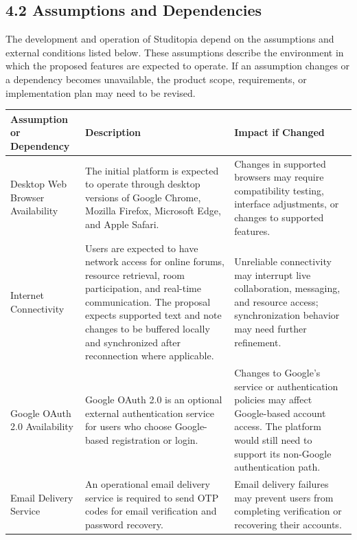 \documentclass[12pt]{article}
\renewcommand{\baselinestretch}{1.5}
\begin{document}
\subsection*{4.2 Assumptions and Dependencies}
\par\medskip
The development and operation of Studitopia depend on the assumptions and external conditions listed below. These assumptions describe the environment in which the proposed features are expected to operate. If an assumption changes or a dependency becomes unavailable, the product scope, requirements, or implementation plan may need to be revised.
\par\medskip
\begingroup
\scriptsize
\renewcommand{\baselinestretch}{1.0}\selectfont
\renewcommand{\arraystretch}{1.15}
\setlength{\tabcolsep}{4pt}
\begin{longtable}{|>{\raggedright\arraybackslash}p{}|>{\raggedright\arraybackslash}p{}|>{\raggedright\arraybackslash}p{}|}
\hline
Assumption or Dependency & Description & Impact if Changed \\ \hline
\endhead
Desktop Web Browser Availability & The initial platform is expected to operate through desktop versions of Google Chrome, Mozilla Firefox, Microsoft Edge, and Apple Safari. & Changes in supported browsers may require compatibility testing, interface adjustments, or changes to supported features. \\ \hline
Internet Connectivity & Users are expected to have network access for online forums, resource retrieval, room participation, and real-time communication. The proposal expects supported text and note changes to be buffered locally and synchronized after reconnection where applicable. & Unreliable connectivity may interrupt live collaboration, messaging, and resource access; synchronization behavior may need further refinement. \\ \hline
Google OAuth 2.0 Availability & Google OAuth 2.0 is an optional external authentication service for users who choose Google-based registration or login. & Changes to Google's service or authentication policies may affect Google-based account access. The platform would still need to support its non-Google authentication path. \\ \hline
Email Delivery Service & An operational email delivery service is required to send OTP codes for email verification and password recovery. & Email delivery failures may prevent users from completing verification or recovering their accounts. \\ \hline

\end{longtable}
\end{document}
